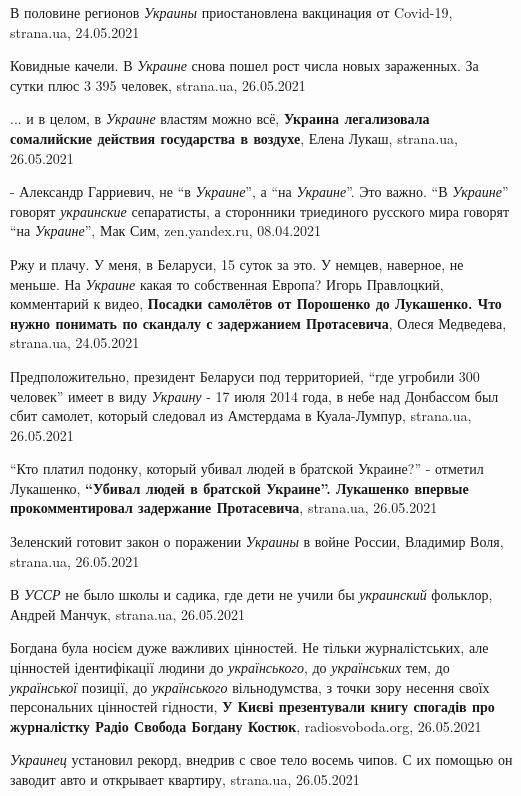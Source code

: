 В половине регионов \emph{Украины} приостановлена вакцинация от Covid-19,
strana.ua, 24.05.2021

Ковидные качели. В \emph{Украине} снова пошел рост числа новых зараженных. За
сутки плюс 3 395 человек, strana.ua, 26.05.2021

... и в целом, в \emph{Украине} властям можно всё, \textbf{Украина легализовала
сомалийские действия государства в воздухе}, Елена Лукаш, strana.ua, 26.05.2021

- Александр Гарриевич, не \enquote{в \emph{Украине}}, а \enquote{на
\emph{Украине}}. Это важно. \enquote{В \emph{Украине}} говорят
\emph{украинские} сепаратисты, а сторонники триединого русского мира говорят
\enquote{на \emph{Украине}}, Мак Сим, zen.yandex.ru, 08.04.2021

Ржу и плачу. У меня, в Беларуси, 15 суток за это. У немцев, наверное, не
меньше. На \emph{Украине} какая то собственная Европа?
Игорь Правлоцкий, комментарий к видео, \textbf{Посадки
самолётов от Порошенко до Лукашенко. Что нужно понимать по скандалу с
задержанием Протасевича}, Олеся Медведева, strana.ua, 24.05.2021

Предположительно, президент Беларуси под территорией, \enquote{где угробили 300
человек} имеет в виду \emph{Украину} - 17 июля 2014 года, в небе над Донбассом был
сбит самолет, который следовал из Амстердама в Куала-Лумпур, strana.ua, 26.05.2021

\enquote{Кто платил подонку, который убивал людей в братской Украине?} -
отметил Лукашенко, \textbf{\enquote{Убивал людей в братской Украине}. Лукашенко
впервые прокомментировал задержание Протасевича}, strana.ua, 26.05.2021

Зеленский готовит закон о поражении \emph{Украины} в войне России, Владимир
Воля, strana.ua, 26.05.2021

В \emph{УССР} не было школы и садика, где дети не учили бы \emph{украинский}
фольклор, Андрей Манчук, strana.ua, 26.05.2021

Богдана була носієм дуже важливих цінностей. Не тільки журналістських, але
цінностей ідентифікації людини до \emph{українського}, до \emph{українських}
тем, до \emph{української} позиції, до \emph{українського} вільнодумства, з
точки зору несення своїх персональних цінностей гідности, \textbf{У Києві
презентували книгу спогадів про журналістку Радіо Свобода Богдану Костюк},
radiosvoboda.org, 26.05.2021

\emph{Украинец} установил рекорд, внедрив с свое тело восемь чипов. С их помощью он
заводит авто и открывает квартиру, strana.ua, 26.05.2021

